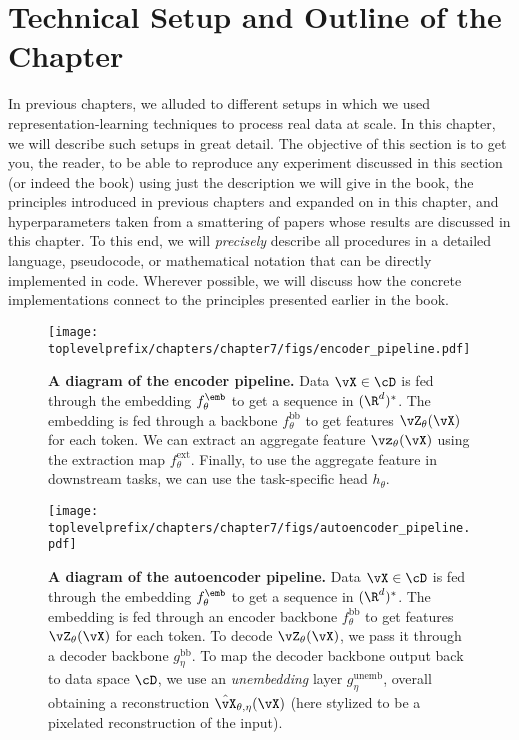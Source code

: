 \documentclass[../../book-main.tex]{subfiles}
\begin{document}
\section{Technical Setup and Outline of the Chapter}\label{sec:experiment_setup}

In previous chapters, we alluded to different setups in which we used representation-learning techniques to process real data at scale. In this chapter, we will describe such setups in great detail. The objective of this section is to get you, the reader, to be able to reproduce any experiment discussed in this section (or indeed the book) using just the description we will give in the book, the principles introduced in previous chapters and expanded on in this chapter, and hyperparameters taken from a smattering of papers whose results are discussed in this chapter. To this end, we will \textit{precisely} describe all procedures in a detailed language, pseudocode, or mathematical notation that can be directly implemented in code. Wherever possible, we will discuss how the concrete implementations connect to the principles presented earlier in the book.

\begin{figure}
    \texttt{[image: \\toplevelprefix/chapters/chapter7/figs/encoder\_pipeline.pdf]}
    \caption{\small\textbf{A diagram of the encoder pipeline.} Data \(\vX \in \cD\) is fed through the embedding \(f_{\theta}^{\emb}\) to get a sequence in \((\R^{d})^{*}\). The embedding is fed through a backbone \(f_{\theta}^{\mathrm{bb}}\) to get features \(\vZ_{\theta}(\vX)\) for each token. We can extract an aggregate feature \(\vz_{\theta}(\vX)\) using the extraction map \(f_{\theta}^{\mathrm{ext}}\). Finally, to use the aggregate feature in downstream tasks, we can use the task-specific head \(h_{\theta}\).}
    \label{fig:overall_encoder_pipeline}
\end{figure}

\begin{figure}
    \texttt{[image: \\toplevelprefix/chapters/chapter7/figs/autoencoder\_pipeline.pdf]}
    \caption{\small\textbf{A diagram of the autoencoder pipeline.} Data \(\vX \in \cD\) is fed through the embedding \(f_{\theta}^{\emb}\) to get a sequence in \((\R^{d})^{*}\). The embedding is fed through an encoder backbone \(f_{\theta}^{\mathrm{bb}}\) to get features \(\vZ_{\theta}(\vX)\) for each token. To decode \(\vZ_{\theta}(\vX)\), we pass it through a decoder backbone \(g_{\eta}^{\mathrm{bb}}\). To map the decoder backbone output back to data space \(\cD\), we use an \textit{unembedding} layer \(g_{\eta}^{\mathrm{unemb}}\), overall obtaining a reconstruction \(\hat{\vX}_{\theta, \eta}(\vX)\) (here stylized to be a pixelated reconstruction of the input).}
    \label{fig:overall_autoencoder_pipeline}
\end{figure}
\end{document}
